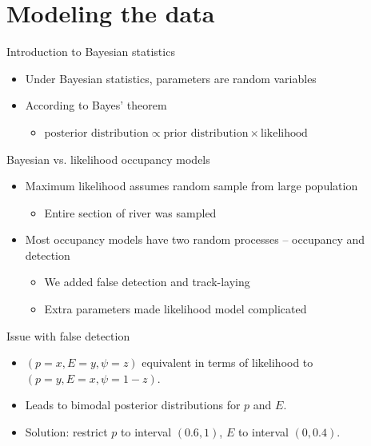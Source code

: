 \documentclass{beamer}
\begin{document}
\section{Modeling the data}
\begin{frame}{Introduction to Bayesian statistics}
	\begin{itemize}
		\item Under Bayesian statistics, parameters are random variables
		\item According to Bayes' theorem
		\begin{itemize}
			\item $\text{posterior distribution} \propto \text{prior
			distribution}\times \text{likelihood}$
		\end{itemize}
	\end{itemize}
\end{frame}

\begin{frame}{Bayesian vs. likelihood occupancy models}
	\begin{itemize}
		\item Maximum likelihood assumes random sample from large population
		\begin{itemize}
			\item Entire section of river was sampled
		\end{itemize}
		\item Most occupancy models have two random processes -- occupancy and
		detection
		\begin{itemize}
			\item We added false detection and track-laying
			\item Extra parameters made likelihood model complicated
		\end{itemize}
	\end{itemize}
\end{frame}

\begin{frame}{Issue with false detection}
	\begin{itemize}
		\item $(p=x, E=y, \psi=z)$ equivalent in terms of likelihood to
		$(p=y,E=x,\psi=1-z)$.
		\item Leads to bimodal posterior distributions for $p$ and $E$.
		\item Solution: restrict $p$ to interval $(0.6,1)$, $E$ to interval
		$(0,0.4)$.
	\end{itemize}
\end{frame}
\end{document}
